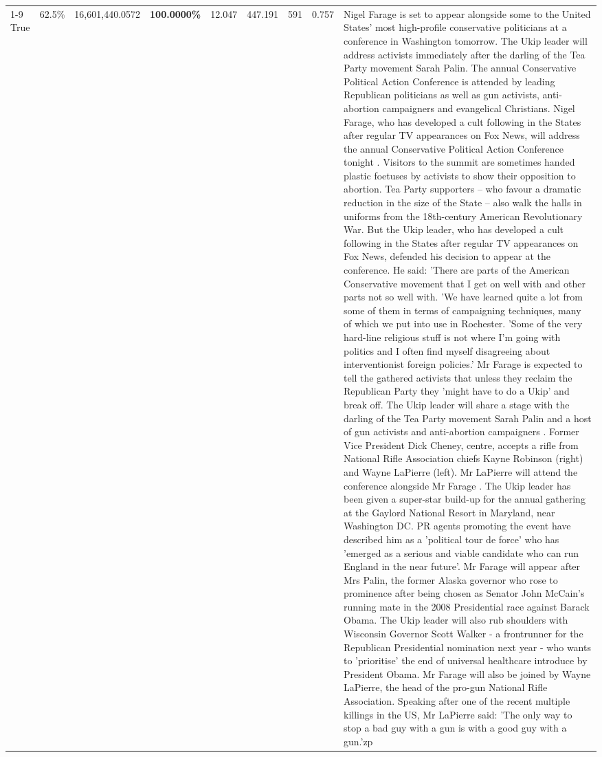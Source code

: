 \begin{table}[H]
\begin{tabular}{lllrlllll}
\cline{1-9}
True & 62.5\% & 16,601,440.0572 & \bfseries \color{red} 100.0000\% & 12.047 & 447.191 & 591 & 0.757 & Nigel Farage is set to appear alongside some to the United States' most high-profile conservative politicians at a conference in Washington tomorrow. The Ukip leader will address activists immediately after the darling of the Tea Party movement Sarah Palin. The annual Conservative Political Action Conference is attended by leading Republican politicians as well as gun activists, anti-abortion campaigners and evangelical Christians. Nigel Farage, who has developed a cult following in the States after regular TV appearances on Fox News, will address the annual Conservative Political Action Conference tonight . Visitors to the summit are sometimes handed plastic foetuses by activists to show their opposition to abortion. Tea Party supporters – who favour a dramatic reduction in the size of the State – also walk the halls in uniforms from the 18th-century American Revolutionary War. But the Ukip leader, who has developed a cult following in the States after regular TV appearances on Fox News, defended his decision to appear at the conference. He said: 'There are parts of the American Conservative movement that I get on well with and other parts not so well with. 'We have learned quite a lot from some of them in terms of campaigning techniques, many of which we put into use in Rochester. 'Some of the very hard-line religious stuff is not where I'm going with politics and I often find myself disagreeing about interventionist foreign policies.' Mr Farage is expected to tell the gathered activists that unless they reclaim the Republican Party they 'might have to do a Ukip' and break off. The Ukip leader will share a stage with the darling of the Tea Party movement Sarah Palin and a host of gun activists and anti-abortion campaigners . Former Vice President Dick Cheney, centre, accepts a rifle from National Rifle Association chiefs Kayne Robinson (right) and Wayne LaPierre (left). Mr LaPierre will attend the conference alongside Mr Farage . The Ukip leader has been given a super-star build-up for the annual gathering at the Gaylord National Resort in Maryland, near Washington DC. PR agents promoting the event have described him as a 'political tour de force' who has 'emerged as a serious and viable candidate who can run England in the near future'. Mr Farage will appear after Mrs Palin, the former Alaska governor who rose to prominence after being chosen as Senator John McCain's running mate in the 2008 Presidential race against Barack Obama. The Ukip leader will also rub shoulders with Wisconsin Governor Scott Walker - a frontrunner for the Republican Presidential nomination next year - who wants to 'prioritise' the end of universal healthcare introduce by President Obama. Mr Farage will also be joined by Wayne LaPierre, the head of the pro-gun National Rifle Association. Speaking after one of the recent multiple killings in the US, Mr LaPierre said: 'The only way to stop a bad guy with a gun is with a good guy with a gun.'zp \\

\end{tabular}
\end{table}
